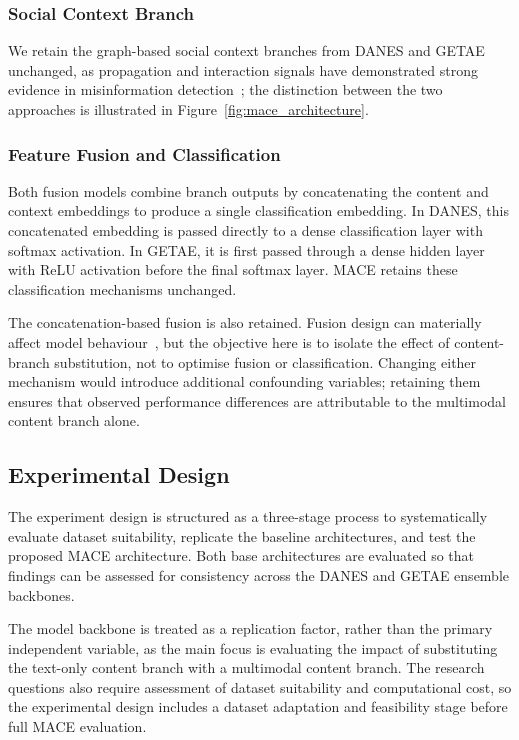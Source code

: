 \subsubsection{Social Context Branch}

We retain the graph-based social context branches from DANES and GETAE unchanged, as propagation and interaction signals have demonstrated strong evidence in misinformation detection~\citep{truica2024danes, GETAE2025, Song2021, Min2022, Zhu24}; the distinction between the two approaches is illustrated in Figure~\ref{fig:mace_architecture}.

\subsubsection{Feature Fusion and Classification}

Both fusion models combine branch outputs by concatenating the content and context embeddings to produce a single classification embedding. In DANES, this concatenated embedding is passed directly to a dense classification layer with softmax activation. In GETAE, it is first passed through a dense hidden layer with ReLU activation before the final softmax layer. MACE retains these classification mechanisms unchanged.

The concatenation-based fusion is also retained. Fusion design can materially affect model behaviour~\citep{Baltrusaitis2019, li2025multimodalalignment}, but the objective here is to isolate the effect of content-branch substitution, not to optimise fusion or classification. Changing either mechanism would introduce additional confounding variables; retaining them ensures that observed performance differences are attributable to the multimodal content branch alone.

\subsection{Experimental Design}

The experiment design is structured as a three-stage process to systematically evaluate dataset suitability, replicate the baseline architectures, and test the proposed MACE architecture. Both base architectures are evaluated so that findings can be assessed for consistency across the DANES and GETAE ensemble backbones.

The model backbone is treated as a replication factor, rather than the primary independent variable, as the main focus is evaluating the impact of substituting the text-only content branch with a multimodal content branch. The research questions also require assessment of dataset suitability and computational cost, so the experimental design includes a dataset adaptation and feasibility stage before full MACE evaluation.

